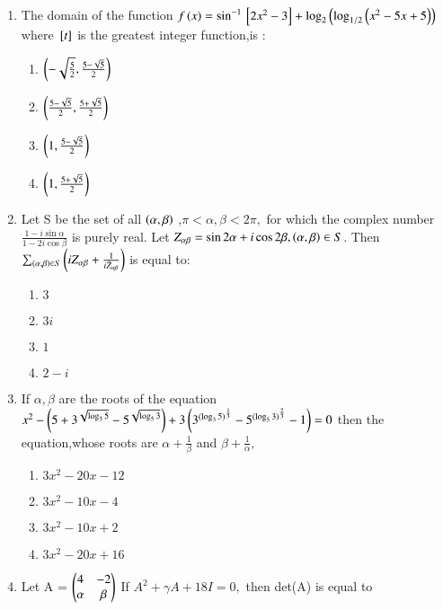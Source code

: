 \documentclass[journal]{IEEEtran}
\begin{document}
\begin{enumerate}
    \item The domain of the function $f\left(x\right) = \sin^{-1}{}\left[2x^2 - 3\right]+ \log_2\left(\log_{1/2}\left(x^2 - 5x + 5\right)\right)$ where ${}\left[t\right]$ is the greatest integer function,is :
    
    \begin{enumerate}
        \item $\left(-\sqrt{\frac{5}{2}},\frac{5-\sqrt{5}}{2}\right)$
        \item $\left(\frac{5-\sqrt{5}}{2}, \frac{5+\sqrt{5}}{2}\right)$
        \item $\left(1,\frac{5-\sqrt{5}}{2}\right)$ 
        \item $\left(1,\frac{5+\sqrt{5}}{2}\right)$ 
    \end{enumerate}
    

    \item Let S be the set of all $\left(\alpha,\beta\right)$ ,$\pi <\alpha, \beta < 2\pi , $ for which the complex number $\frac{1-i\sin\alpha}{1-2i\cos\beta}$ is purely real. Let $Z_{\alpha\beta} =\sin2\alpha + i\cos2\beta,\left(\alpha,\beta\right) \in S $. Then $\sum_{\left(\alpha,\beta\right)\in S }\left(iZ_{\alpha\beta} + \frac{1}{i\bar{Z}_{\alpha\beta}}\right) $ is equal to: 
    
    \begin{enumerate}
        \item $3$
        \item $3i$
        \item $1$
        \item $2-i$
    \end{enumerate}
    

    \item  If $\alpha, \beta$ are the roots of the equation $x^{2} - \left(5 + 3^{\sqrt{\log_3{5}}} -  5^{\sqrt{\log_5{3}}}\right)  +  3\left(3^{(\log_3{5})^\frac{1}{3}} - 5^{(\log_5{3})^\frac{2}{3}} - 1\right) = 0$ then the equation,whose roots are $\alpha + \frac{1}{\beta} $ and $\beta + \frac{1}{\alpha},$ 
    
    \begin{enumerate}
        \item $3x^2 - 20x -12$
        \item $3x^2 -10x-4$ 
        \item $3x^2 - 10x +2$ 
        \item $3x^2 -20x + 16$   
    \end{enumerate}


     \item Let A = $\begin{pmatrix}4 & -2 \\ \alpha & \beta\end{pmatrix}$ If $A^2 + \gamma A + 18I = 0,$ then det(A) is equal to 
     

\end{enumerate}
\end{document}
